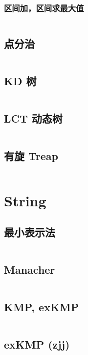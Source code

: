 \documentclass[titlepage, a4paper]{article}
\begin{document}
\begin{multicols}{2}
\begin{spacing}{0.6}
					\subsubsection{区间加，区间求最大值}
						\inputminted{cpp}{src/DataStructure/非递归线段树求最大值.cpp}
				\subsection{点分治}
					\inputminted{cpp}{src/DataStructure/点分治.cpp}
				\subsection{KD 树}
					\inputminted{cpp}{src/DataStructure/KD tree.cpp}
				\subsection{LCT 动态树}
					\inputminted{cpp}{src/DataStructure/LCT.cpp}
				\subsection{有旋 Treap}
					\inputminted{cpp}{src/DataStructure/有旋treap.cpp}
			
			\section{String}
				\subsection{最小表示法}
					\inputminted{cpp}{src/String/最小表示法.cpp}
				\subsection{Manacher}
					\inputminted{cpp}{src/String/Manacher.cpp}
				\subsection{KMP, exKMP}
					\inputminted{cpp}{src/String/KMP.cpp}
				\subsection{exKMP (zjj)}
					\inputminted{cpp}{src/zjj/exkmp.cpp}

\end{spacing}
\end{multicols}
\end{document}
